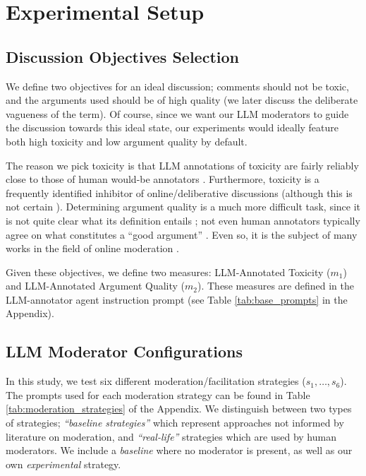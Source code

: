 \section{Experimental Setup}

\subsection{Discussion Objectives Selection}

We define two objectives for an ideal discussion; comments should not be toxic, and the arguments used should be of high quality (we later discuss the deliberate vagueness of the term). Of course, since we want our \ac{LLM} moderators to guide the discussion towards this ideal state, our experiments would ideally feature both high toxicity and low argument quality by default. 

The reason we pick toxicity is that \ac{LLM} annotations of toxicity are fairly reliably close to those of human would-be annotators \citep{kang-qian-2024-implanting, Wang2022ToxicityDW, anjum2024hate}. Furthermore, toxicity is a frequently identified inhibitor of online/deliberative discussions \citep{dekock2022disagree, XiaToxicity} (although this is not certain \citep{Avalle2024PersistentIP}). Determining argument quality is a much more difficult task, since it is not quite clear what its definition entails \cite{korre2025evaluation}; not even human annotators typically agree on what constitutes a “good argument” \cite{argyle2023}. Even so, it is the subject of many works in the field of online moderation \cite{argyle2023, schroeder-etal-2024-fora, falk-etal-2024-moderation, falk-etal-2021-predicting}.

Given these objectives, we define two measures: \ac{LLM}-Annotated Toxicity ($m_1$) and \ac{LLM}-Annotated Argument Quality ($m_2$). These measures are defined in the \ac{LLM}-annotator agent instruction prompt (see Table \ref{tab:base_prompts} in the Appendix).


\subsection{LLM Moderator Configurations}
\label{ssec:setup:strategies}

In this study, we test six different moderation/facilitation strategies ($s_1, \ldots, s_6$). The prompts used for each moderation strategy can be found in Table \ref{tab:moderation_strategies} of the Appendix. We distinguish between two types of strategies; \emph{“baseline strategies”} which represent approaches not informed by literature on moderation, and \emph{“real-life”} strategies which are used by human moderators. We include a \emph{baseline} where no moderator is present, as well as our own \emph{experimental} strategy.

